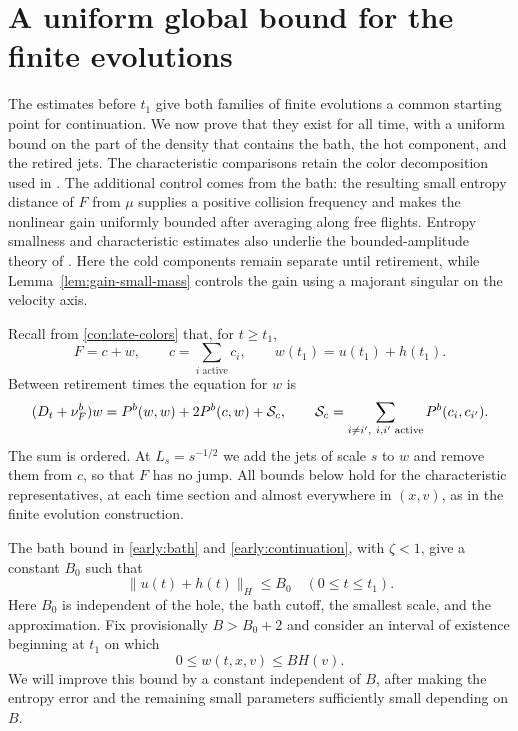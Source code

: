 \section{A uniform global bound for the finite evolutions}
\label{sec:global}

The estimates before $t_1$ give both families of finite evolutions a
common starting point for continuation.  We now prove that they exist
for all time, with a uniform bound on the part of the density that
contains the bath, the hot component, and the retired jets.  The
characteristic comparisons retain the color decomposition used in
\cite[Sections~5--6]{OpenAIPeriodic}.  The additional control comes from
the bath: the resulting small entropy distance of $F$ from $\mu$ supplies a
positive collision frequency and makes the nonlinear gain uniformly
bounded after averaging along free flights.
Entropy smallness and characteristic estimates also underlie the
bounded-amplitude theory of
\cite[Section~3]{DuanHuangWangYang2017}. Here the cold components remain
separate until retirement, while Lemma~\ref{lem:gain-small-mass}
controls the gain using a majorant singular on the velocity axis.

Recall from \eqref{con:late-colors} that, for $t\ge t_1$,
\begin{equation}\label{global:decomposition}
 F=c+w,\qquad c=\sum_{i\text{ active}}c_i,
 \qquad w(t_1)=u(t_1)+h(t_1).
\end{equation}
Between retirement times the equation for $w$ is
\begin{equation}\label{global:w-equation}
 (D_t+\nu_F^b)w=P^b(w,w)+2P^b(c,w)+\mathcal S_c,
 \qquad
 \mathcal S_c=\sum_{i\ne i',\ i,i'\text{ active}}P^b(c_i,c_{i'}).
\end{equation}
The sum is ordered.  At $L_s=s^{-1/2}$ we add the jets of scale $s$ to
$w$ and remove them from $c$, so that $F$ has no jump.  All bounds below
hold for the characteristic representatives, at each time section and
almost everywhere in $(x,v)$, as in the finite evolution construction.

The bath bound in \cref{early:bath} and
\cref{early:continuation}, with $\zeta<1$, give a constant $B_0$ such that
\begin{equation}\label{global:initial-bound}
 \|u(t)+h(t)\|_H\le B_0\quad(0\le t\le t_1).
\end{equation}
Here $B_0$ is independent of the hole, the bath cutoff, the smallest
scale, and the approximation.  Fix provisionally $B>B_0+2$ and consider
an interval of existence beginning at $t_1$ on which
\begin{equation}\label{global:bootstrap}
 0\le w(t,x,v)\le B H(v).
\end{equation}
We will improve this bound by a constant independent of $B$, after
making the entropy error and the remaining small parameters sufficiently
small depending on $B$.

